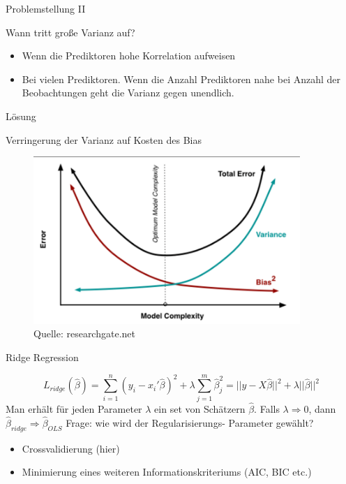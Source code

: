 \documentclass[10pt]{beamer}
\begin{document}
\begin{frame}{Problemstellung II}
        
        \begin{Large}{Wann tritt große Varianz auf?}\end{Large}
        
        \begin{itemize}
            \item Wenn die Prediktoren hohe Korrelation aufweisen
            \item Bei vielen Prediktoren. Wenn die Anzahl Prediktoren nahe bei Anzahl der Beobachtungen geht die Varianz gegen unendlich.
        \end{itemize}
    
\end{frame}

\begin{frame}{Lösung}

    \begin{Large}{Verringerung der Varianz auf Kosten des Bias}\end{Large}

        \begin{figure}
            \centering
            \includegraphics[width=0.9\textwidth]{figures/complexity_error.png}
            \caption{Quelle: researchgate.net}
        \end{figure}
        
\end{frame}

\begin{frame}{Ridge Regression}
	
    \begin{equation*}
        L_{ridge}(\hat{\beta})=\sum_{i=1}^{n}(y_{i}-x_{i}'\hat{\beta})^2+\lambda\sum_{j=1}^{m}\hat{\beta}_{j}^2=||y-X\hat{\beta}||^2+\lambda||\hat{\beta}||^2
    \end{equation*}
    Man erhält für jeden Parameter $\lambda$ ein set von Schätzern $\hat{\beta}$.
    Falls $\lambda \Rightarrow 0$, dann $\hat{\beta}_{ridge} \Rightarrow \hat{\beta}_{OLS}$
    Frage: wie wird der Regularisierungs- Parameter gewählt?
    \begin{itemize}
        \item Crossvalidierung (hier)
        \item Minimierung eines weiteren Informationskriteriums (AIC, BIC etc.)
    \end{itemize}
    
\end{frame}
\end{document}
